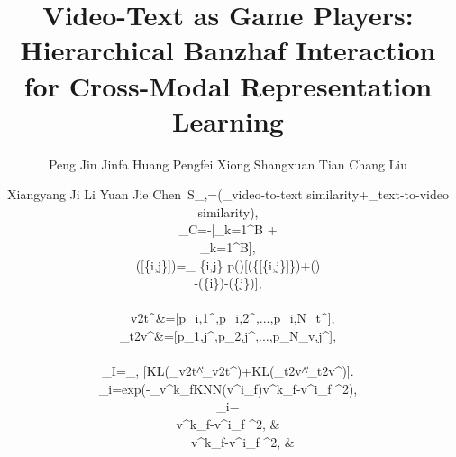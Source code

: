 \documentclass[10pt,twocolumn,letterpaper]{article}
\begin{document}
\title{Video-Text as Game Players:\\ Hierarchical Banzhaf Interaction for Cross-Modal Representation Learning}

\author{Peng Jin \quad
    Jinfa Huang \quad
    Pengfei Xiong \quad
    Shangxuan Tian \quad
    Chang Liu \quad
    \and
    Xiangyang Ji \quad
    Li Yuan\footnotemark[1] \quad
    Jie Chen\footnotemark[1]\
\textrm{S}_{,}=(_{\textrm{video-to-text similarity}}+_{\textrm{text-to-video similarity}}),

\begin{aligned}
_{C}=-[\sum_{k=1}^{B}\log{} +\\  \sum_{k=1}^{B}\log{}],
\end{aligned}

\begin{aligned}
([\{i,j\}])=\!\sum_{\! \subseteq {} \setminus \{i,j\} }p()[\phi(\cup \{[\{i,j\}]\})+\phi()\\-\phi(\cup\{i\})-\phi(\cup\{j\})],
\end{aligned}
\label{BI}

\begin{aligned}
_{v2t}^{}&=[p_{i,1}^{},p_{i,2}^{},...,p_{i,N_t}^{}],\\
\mathcal{D}_{t2v}^{\mathcal{I}}&=[\hat p_{1,j}^{},\hat p_{2,j}^{\mathcal{I}},...,\hat p_{N_v,j}^{\mathcal{I}}],
\end{aligned}
\label{Dis}

_{I}=_{,} [\textrm{KL}(_{v2t}^{}\|_{v2t}^{})+\textrm{KL}(_{t2v}^{}\|_{t2v}^{})].

\rho_i=\textrm{exp}(-\sum_{v^{k}_{f}\in \textrm{KNN}(v^{i}_{f})}\Vert v^{k}_{f}-v^{i}_{f} \Vert^2),

\delta_i=
\begin{cases}
 \Vert v^{k}_{f}-v^{i}_{f} \Vert^2, & \\
\ \ \underset{j}{\textrm{max}} \ \ \Vert v^{k}_{f}-v^{i}_{f} \Vert^2, & \text{otherwise.}
\end{cases}

}
\end{document}
